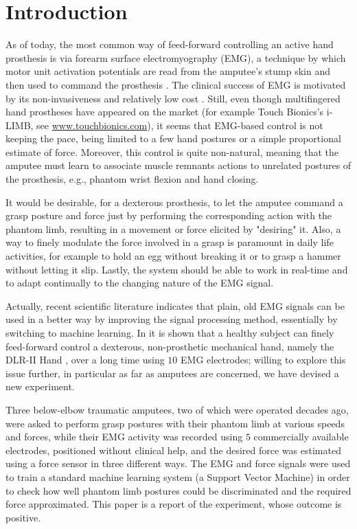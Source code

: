 \section{Introduction}
\label{sec:intro}

As of today, the most common way of feed-forward controlling an active
hand prosthesis is via forearm surface electromyography (EMG),
a technique by which motor unit activation potentials are read from the
amputee's stump skin and then used to command the prosthesis \cite{deluca97}.
The clinical success of EMG is motivated by its non-invasiveness and
relatively low cost \cite{englehart06}.
Still, even though multifingered hand prostheses have appeared on the market
(for example Touch Bionics's i-LIMB, see \url{www.touchbionics.com}),
it seems that EMG-based control is not keeping the pace, being limited to a
few hand postures or a simple proportional estimate of force.
Moreover, this control is quite non-natural, meaning that the amputee must
learn to associate muscle remnants actions to unrelated postures of the
prosthesis, e.g., phantom wrist flexion and hand closing.

It would be desirable, for a dexterous prosthesis, to let the amputee command a
grasp posture and force just by performing the corresponding action with the
phantom limb, resulting in a movement or force elicited by "desiring"
it. Also, a way to finely modulate the force involved in a grasp is paramount
in daily life activities, for example to hold an egg without breaking it or to
grasp a hammer without letting it slip. Lastly, the system should be able to
work in real-time and to adapt continually to the changing nature of the EMG
signal.

Actually, recent scientific literature
indicates that plain, old EMG signals can be used in a better way by improving
the signal processing method, essentially by switching to machine learning.
In \cite{2008.BioCyb} it is shown that a healthy subject can finely feed-forward
control a dexterous, non-prosthetic mechanical hand, namely the DLR-II Hand
\cite{ButFisGre2004}, over a long time using $10$ EMG electrodes; willing to
explore this issue further, in particular as far as amputees are concerned, we
have devised a new experiment.

Three below-elbow traumatic amputees, two of which
were operated decades ago, were asked to perform
grasp postures with their phantom limb at various speeds and forces, while their
EMG activity was recorded using $5$ commercially available electrodes, positioned
without clinical help, and the desired force was
estimated using a force sensor in three different ways.
The EMG and force signals were used to train a standard machine learning system
(a Support Vector Machine) in order to check how well phantom limb postures
could be discriminated and the required force approximated. This paper is
a report of the experiment, whose outcome is positive.

